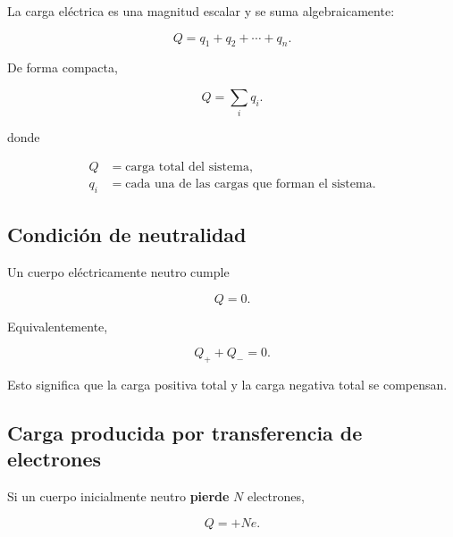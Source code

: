 La carga eléctrica es una magnitud escalar y se suma algebraicamente:

\begin{equation}
    \boxed{
    Q=q_1+q_2+\cdots+q_n
    }.
\end{equation}

De forma compacta,

\begin{equation}
    \boxed{
    Q=\sum_i q_i
    }.
\end{equation}

donde

\begin{align*}
    Q   &= \text{carga total del sistema},\\
    q_i &= \text{cada una de las cargas que forman el sistema}.
\end{align*}



\subsection{Condición de neutralidad}

Un cuerpo eléctricamente neutro cumple

\begin{equation}
    \boxed{
    Q=0
    }.
\end{equation}

Equivalentemente,

\begin{equation}
    \boxed{
    Q_{+}+Q_{-}=0
    }.
\end{equation}

Esto significa que la carga positiva total y la carga negativa total se
compensan.



\subsection{Carga producida por transferencia de electrones}

Si un cuerpo inicialmente neutro \textbf{pierde} \(N\) electrones,

\begin{equation}
    \boxed{
    Q=+Ne
    }.
\end{equation}

